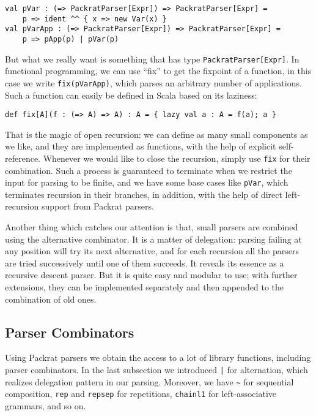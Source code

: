  \begin{lstlisting}
val pVar : (=> PackratParser[Expr]) => PackratParser[Expr] =
    p => ident ^^ { x => new Var(x) }
val pVarApp : (=> PackratParser[Expr]) => PackratParser[Expr] =
    p => pApp(p) | pVar(p)
\end{lstlisting}
But what we really want is something that has type \lstinline{PackratParser[Expr]}. In functional programming, we can use ``fix'' to get the fixpoint of a function, in this case we write \lstinline{fix(pVarApp)}, which parses an arbitrary number of applications. Such a function can easily be defined
in Scala based on its laziness:
\begin{lstlisting}
def fix[A](f : (=> A) => A) : A = { lazy val a : A = f(a); a }
\end{lstlisting}
That is the magic of open recursion: we can define as many small components as we like, and they are implemented as functions, with the help of explicit self-reference. Whenever we would like to close the recursion, simply use \lstinline{fix} for their combination. Such a process is guaranteed to terminate when we restrict the input for parsing to be finite, and we have some base cases like \lstinline{pVar}, which terminates recursion in their branches, in addition, with the help of direct left-recursion support from Packrat parsers.

Another thing which catches our attention is that, small parsers are combined using the alternative combinator. It is a matter of delegation: parsing failing at any position will try its next alternative, and for each recursion all the parsers are tried successively until one of them succeeds. It reveals its essence as a recursive descent parser. But it is quite easy and modular to use; with further extensions, they can be implemented separately and then appended to the combination of old ones.

\subsection{Parser Combinators}\label{subsec:parsercombinators}

Using Packrat parsers we obtain the access to a lot of library functions, including parser combinators. In the last subsection we introduced \lstinline{|} for alternation, which realizes delegation pattern in our parsing. Moreover, we have \lstinline{~} for sequential composition, \lstinline{rep} and \lstinline{repsep} for repetitions, \lstinline{chainl1} for left-associative grammars, and so on.

